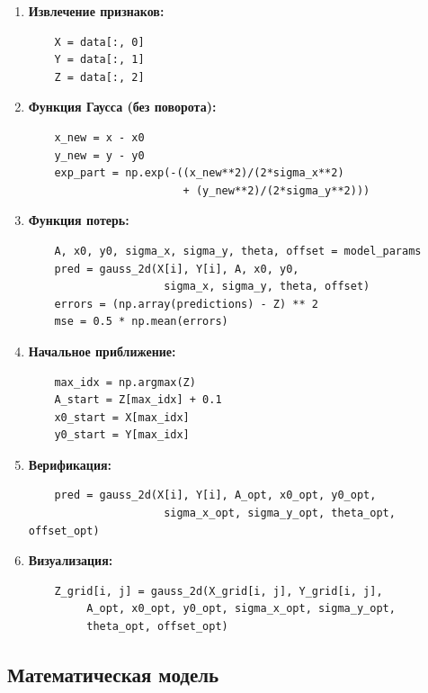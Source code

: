 \begin{enumerate}
    \item \textbf{Извлечение признаков:}
    \begin{verbatim}
    X = data[:, 0]
    Y = data[:, 1]
    Z = data[:, 2]
    \end{verbatim}

    \item \textbf{Функция Гаусса (без поворота):}
    \begin{verbatim}
    x_new = x - x0
    y_new = y - y0
    exp_part = np.exp(-((x_new**2)/(2*sigma_x**2)
                        + (y_new**2)/(2*sigma_y**2)))
    \end{verbatim}

    \item \textbf{Функция потерь:}
    \begin{verbatim}
    A, x0, y0, sigma_x, sigma_y, theta, offset = model_params
    pred = gauss_2d(X[i], Y[i], A, x0, y0,
                     sigma_x, sigma_y, theta, offset)
    errors = (np.array(predictions) - Z) ** 2
    mse = 0.5 * np.mean(errors)
    \end{verbatim}

    \item \textbf{Начальное приближение:}
    \begin{verbatim}
    max_idx = np.argmax(Z)
    A_start = Z[max_idx] + 0.1
    x0_start = X[max_idx]
    y0_start = Y[max_idx]
    \end{verbatim}

    \item \textbf{Верификация:}
    \begin{verbatim}
    pred = gauss_2d(X[i], Y[i], A_opt, x0_opt, y0_opt,
                     sigma_x_opt, sigma_y_opt, theta_opt, offset_opt)
    \end{verbatim}

    \item \textbf{Визуализация:}
    \begin{verbatim}
    Z_grid[i, j] = gauss_2d(X_grid[i, j], Y_grid[i, j],
         A_opt, x0_opt, y0_opt, sigma_x_opt, sigma_y_opt,
         theta_opt, offset_opt)
    \end{verbatim}
\end{enumerate}

\subsection{Математическая модель}

